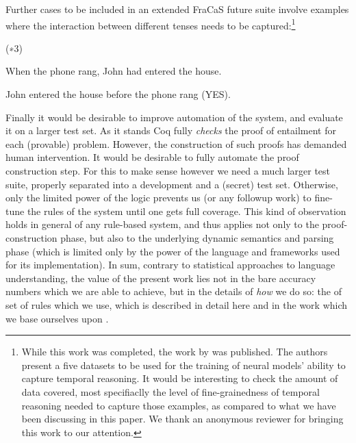 \documentclass[11pt,a4paper]{article}
\newcommand\hyp{\item[H]}
\newcommand\fracasex[2]{\begin{lingex}\item[(#1)] \begin{subex} #2 \end{subex} \end{lingex} }
\begin{document}
Further cases to be included in an extended FraCaS future suite
involve examples where the interaction between different tenses needs
to be captured:\footnote{While this work was completed, the work by \cite{vashishtha-etal-2020} was published. The authors present a five datasets to be used for the training of neural models' ability to capture temporal reasoning. It would be interesting to check the amount of data covered, most specifiaclly the level of fine-grainedness of temporal reasoning needed to capture those examples, as compared to what we have been discussing in this paper. We thank an anonymous reviewer for bringing this work to our attention.}

\fracasex{∗3}{
	\item	When the phone rang, John had entered the house.  
	\hyp 	John entered the house before the phone rang (YES).
}


Finally it would be desirable to improve automation of the system, and
evaluate it on a larger test set. As it stands Coq fully \emph{checks}
the proof of entailment for each (provable) problem. However, the
construction of such proofs has demanded human intervention. It would
be desirable to fully automate the proof construction step. For this
to make sense however we need a much larger test suite, properly
separated into a development and a (secret) test set. Otherwise, only
the limited power of the logic prevents us (or any followup work) to
fine-tune the rules of the system until one gets full coverage. This
kind of observation holds in general of any rule-based system, and
thus applies not only to the proof-construction phase, but also to the
underlying dynamic semantics and parsing phase (which is limited only
by the power of the language and frameworks used for its
implementation). In sum, contrary to statistical approaches to
language understanding, the value of the present work lies not in the
bare accuracy numbers which we are able to achieve, but in the details
of \emph{how} we do so: the of set of rules which we use, which is
described in detail here and in the work which we base ourselves upon
\citep{bernardy_computational_2020,bernardy_wide-coverage_2019}.

\ifanon
\end{document}

